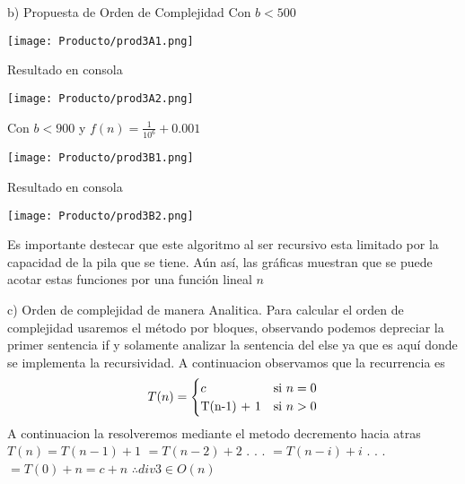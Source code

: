 \documentclass[12pt,twoside]{article}
\begin{document}
\begin{enumerate} b) Propuesta de Orden de Complejidad \newline\newline
Con $b < 500$
\begin{center}
    \texttt{[image: Producto/prod3A1.png]}
\end{center}
Resultado en consola
\begin{center}
    \texttt{[image: Producto/prod3A2.png]}
\end{center}
Con $b < 900$ y $f(n) = \frac{1}{10^6} + 0.001$
\begin{center}
    \texttt{[image: Producto/prod3B1.png]}
\end{center}
Resultado en consola
\begin{center}
    \texttt{[image: Producto/prod3B2.png]}
\end{center}
Es importante destecar que este algoritmo al ser recursivo esta limitado por la capacidad de la pila que se tiene. Aún así, las gráficas muestran que se puede acotar estas funciones por una función lineal $n$
\end{enumerate}
\begin{enumerate} c) Orden de complejidad de manera Anal\´itica.
\newline\newline
Para calcular el orden de complejidad usaremos el método por bloques, observando podemos depreciar la primer sentencia if y solamente analizar la sentencia del else ya que es aquí donde se implementa la recursividad. A continuaci\´on observamos que la recurrencia es
\begin{equation}
  T(n) =
    \begin{cases}
      c & \text{si $n = 0$}\\
      $T(n-1) + 1$ & \text{si $n > 0$}\\
    \end{cases}
\end{equation}
A continuaci\´on la resolveremos mediante el metodo decremento hacia atr\´as
\newline
$T(n) = T(n-1) + 1$\newline
    $ = T(n-2) + 2$\newline
    $.$\newline
    $.$\newline
    $.$\newline
    $ = T(n-i) + i$\newline
    $.$\newline
    $.$\newline
    $.$\newline
    $ = T(0) + n = c + n$\newline
$\therefore div3 \in O(n)$

\end{enumerate}
\end{document}
